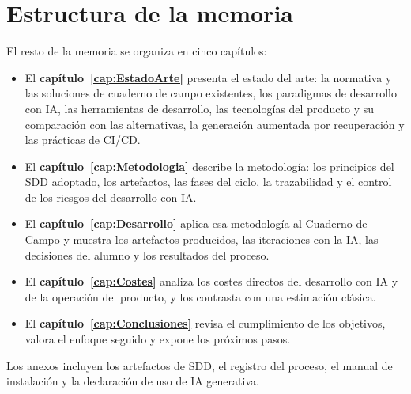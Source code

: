 \section{Estructura de la memoria}\label{sec:Estructura}

El resto de la memoria se organiza en cinco capítulos:

\begin{itemize}
	\item El \textbf{capítulo~\ref{cap:EstadoArte}} presenta el estado del arte: la normativa y las soluciones de cuaderno de campo existentes, los paradigmas de desarrollo con IA, las herramientas de desarrollo, las tecnologías del producto y su comparación con las alternativas, la generación aumentada por recuperación y las prácticas de CI/CD.
	\item El \textbf{capítulo~\ref{cap:Metodologia}} describe la metodología: los principios del SDD adoptado, los artefactos, las fases del ciclo, la trazabilidad y el control de los riesgos del desarrollo con IA.
	\item El \textbf{capítulo~\ref{cap:Desarrollo}} aplica esa metodología al Cuaderno de Campo y muestra los artefactos producidos, las iteraciones con la IA, las decisiones del alumno y los resultados del proceso.
	\item El \textbf{capítulo~\ref{cap:Costes}} analiza los costes directos del desarrollo con IA y de la operación del producto, y los contrasta con una estimación clásica.
	\item El \textbf{capítulo~\ref{cap:Conclusiones}} revisa el cumplimiento de los objetivos, valora el enfoque seguido y expone los próximos pasos.
\end{itemize}

Los anexos incluyen los artefactos de SDD, el registro del proceso, el manual de instalación y la declaración de uso de IA generativa.

